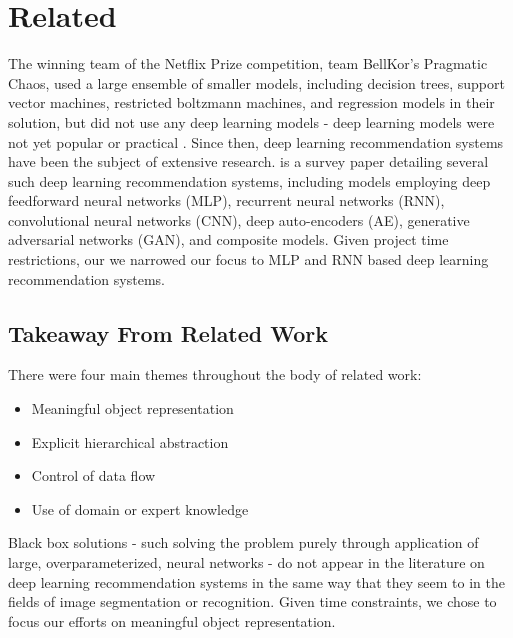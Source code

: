 \section{Related}
The winning team of the Netflix Prize competition, team BellKor's Pragmatic Chaos, used a large ensemble of smaller models, including decision trees, support vector machines, restricted boltzmann machines, and regression models in their solution, but did not use any deep learning models - deep learning models were not yet popular or practical \cite{Piotte 09th Pragmatic}\cite{bigChaos}\cite{Koren091the}. Since then, deep learning recommendation systems have been the subject of extensive research. \cite{DBLP:journals/corr/ZhangYS17aa} is a survey paper detailing several such deep learning recommendation systems, including models employing deep feedforward neural networks (MLP), recurrent neural networks (RNN), convolutional neural networks (CNN), deep auto-encoders (AE), generative adversarial networks (GAN), and composite models. Given project time restrictions, our we narrowed our focus to MLP and RNN based deep learning recommendation systems. 
\subsection{Takeaway From Related Work}
There were four main themes throughout the body of related work:
\begin{itemize}
\item Meaningful object representation
\item Explicit hierarchical abstraction
\item Control of data flow
\item Use of domain or expert knowledge
\end{itemize}
Black box solutions - such solving the problem purely through application of large, overparameterized, neural networks - do not appear in the literature on deep learning recommendation systems in the same way that they seem to in the fields of image segmentation or recognition. Given time constraints, we chose to focus our efforts on meaningful object representation.  